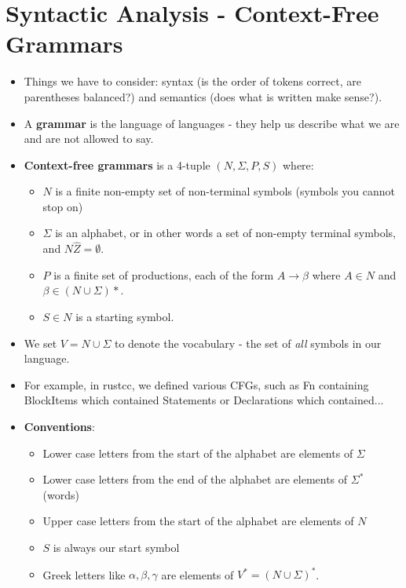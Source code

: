 \documentclass[12pt]{article}
\begin{document}
\section{Syntactic Analysis - Context-Free Grammars}
\begin{itemize}
    \item Things we have to consider: syntax (is the order of tokens correct, are parentheses balanced?) and semantics (does what is written make sense?).
    \item A \textbf{grammar} is the language of languages - they help us describe what we are and are not allowed to say.
    \item \textbf{Context-free grammars} is a 4-tuple $(N, \Sigma, P, S)$ where:
        \begin{itemize}
            \item $N$ is a finite non-empty set of non-terminal symbols (symbols you cannot stop on)
            \item $\Sigma$ is an alphabet, or in other words a set of non-empty terminal symbols, and $N \hat Z = \emptyset$.
            \item $P$ is a finite set of productions, each of the form $A \rightarrow \beta$ where $A \in N$ and $\beta \in (N \cup \Sigma)*$.
            \item $S \in N$ is a starting symbol.
        \end{itemize}
    \item We set $V = N \cup \Sigma$ to denote the vocabulary - the set of \emph{all} symbols in our language.
    \item For example, in rustcc, we defined various CFGs, such as Fn containing BlockItems which contained Statements or Declarations which contained...
    \item \textbf{Conventions}:
        \begin{itemize}
            \item Lower case letters from the start of the alphabet are elements of $\Sigma$
            \item Lower case letters from the end of the alphabet are elements of $\Sigma^*$ (words)
            \item Upper case letters from the start of the alphabet are elements of $N$
            \item $S$ is always our start symbol
            \item Greek letters like $\alpha, \beta, \gamma$ are elements of $V^* = (N \cup \Sigma)^*$.
        \end{itemize}

\end{itemize}
\end{document}
